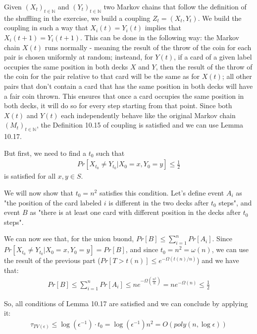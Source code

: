 \documentclass[a4paper,german]{article}
\begin{document}
Given $(X_t)_{t\in\mathbb{N}} $ and $(Y_t)_{t\in\mathbb{N}} $ two Markov chains that follow the definition
of the shuffling in the exercise, we build a coupling $Z_t = (X_t, Y_t)$. We build the coupling in 
such a way that $X_i(t) = Y_i(t)$ implies that $X_i(t+1) = Y_i(t+1)$. This can be done in the following
way: the Markov chain $X(t)$ runs normally - meaning the result of the throw of the coin for each
pair is chosen uniformly at random; insteand, for $Y(t)$, if a card of a given label occupies the
same position in both decks $X$ and $Y$, then the result of the throw of the coin for the pair
relative to that card will be the same as for $X(t)$; all other pairs that don't contain a card
that has the same position in both decks will have a fair coin thrown. 
This ensures that once a card occupies the same position in both decks, it will do so for every 
step starting from that point. Since both $X(t)$ and $Y(t)$ each independently behave like
the original Markov chain $(M_t)_{t\in\mathbb{N}}$, the Definition 10.15 of coupling is satisfied and
we can use Lemma 10.17. 

But first, we need to find a $t_0$ such that 
\begin{align*}
	Pr [ X_{t_0} \neq Y_{t_0} | X_0 = x, Y_0 = y] \leq \frac{1}{2}
\end{align*}
is satisfied for all $x,y\in S$.

We will now show that $t_0 = n^2$ satisfies this condition. 
Let's define event $A_i$ as  "the position of the card labeled $i$ is different in the two decks after $t_0$ steps", and event $B$ as "there is at least one card with different position in the decks after $t_0$ steps".

We can now see that, for the union buond, $Pr[B] \leq \sum_{i=1}^n Pr[A_i]$.
Since $Pr [ X_{t_0} \neq Y_{t_0} | X_0 = x, Y_0 = y] = Pr[B]$, and since $t_0 = n^2 = \omega(n)$, we can use the result of the previous part ($Pr[ T > t(n)] \leq e^{- \Omega(t(n)/n)}$) and we have that:
\begin{align*}
	Pr[B] \leq \sum_{i=1}^n Pr[A_i] 
	\leq ne^{-\Omega(\frac{n^2}{n})} = ne^{-\Omega(n)} \leq \frac{1}{2}
\end{align*}

So, all conditions of Lemma 10.17 are satisfied and we can conclude by applying it:
\begin{align*}
	\tau_{TV(\epsilon)} \leq \log(\epsilon ^ {-1}) \cdot t_0 = \log(\epsilon^{-1}) n^2 = O(poly(n, \log \epsilon))
\end{align*}
\end{document}
